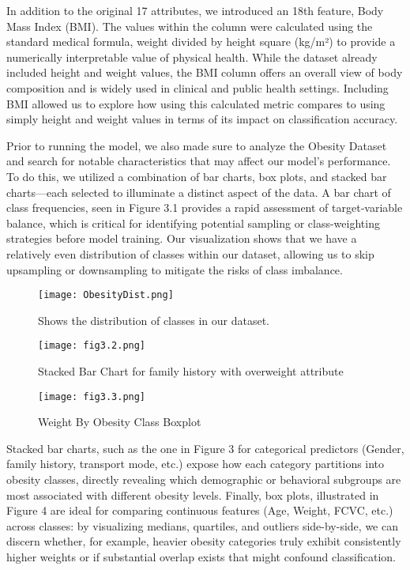 \documentclass[conference]{IEEEtran}
\begin{document}
In addition to the original 17 attributes, we introduced an 18th feature, Body Mass Index (BMI). The values within the column were calculated using the standard medical formula, weight divided by height square (kg/m²) to provide a numerically interpretable value of physical health. While the dataset already included height and weight values, the BMI column offers an overall view of body composition and is widely used in clinical and public health settings. Including BMI allowed us to explore how using this calculated metric compares to using simply height and weight values in terms of its impact on classification accuracy.

Prior to running the model, we also made sure to analyze the Obesity Dataset and search for notable characteristics that may affect our model’s performance. To do this, we utilized a combination of bar charts, box plots, and stacked bar charts—each selected to illuminate a distinct aspect of the data. A bar chart of class frequencies, seen in Figure 3.1 provides a rapid assessment of target‐variable balance, which is critical for identifying potential sampling or class-weighting strategies before model training. Our visualization shows that we have a relatively even distribution of classes within our dataset, allowing us to skip upsampling or downsampling to mitigate the risks of class imbalance.

\begin{figure}[htbp]
\centering
\texttt{[image: ObesityDist.png]}
\caption{Shows the distribution of classes in our dataset. }
\label{Table 3.1}
\end{figure}

\begin{figure}[htbp]
\centering
\texttt{[image: fig3.2.png]}
\caption{Stacked Bar Chart for family history with overweight attribute}
\label{Table 3.1}
\centering
\texttt{[image: fig3.3.png]}
\caption{Weight By Obesity Class Boxplot}
\label{Table 3.1}
\end{figure}

Stacked bar charts, such as the one in Figure 3 for categorical predictors (Gender, family history, transport mode, etc.) expose how each category partitions into obesity classes, directly revealing which demographic or behavioral subgroups are most associated with different obesity levels. Finally, box plots, illustrated in Figure 4 are ideal for comparing continuous features (Age, Weight, FCVC, etc.) across classes: by visualizing medians, quartiles, and outliers side-by-side, we can discern whether, for example, heavier obesity categories truly exhibit consistently higher weights or if substantial overlap exists that might confound classification.
\end{document}
